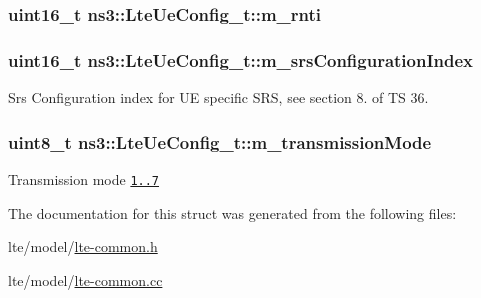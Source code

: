 \subsubsection[{\texorpdfstring{m\+\_\+rnti}{m_rnti}}]{\setlength{\rightskip}{0pt plus 5cm}uint16\+\_\+t ns3\+::\+Lte\+Ue\+Config\+\_\+t\+::m\+\_\+rnti}\hypertarget{structns3_1_1LteUeConfig__t_acba18d5f8ffa2d57965463f040a11ce3}{}\label{structns3_1_1LteUeConfig__t_acba18d5f8ffa2d57965463f040a11ce3}
\subsubsection[{\texorpdfstring{m\+\_\+srs\+Configuration\+Index}{m_srsConfigurationIndex}}]{\setlength{\rightskip}{0pt plus 5cm}uint16\+\_\+t ns3\+::\+Lte\+Ue\+Config\+\_\+t\+::m\+\_\+srs\+Configuration\+Index}\hypertarget{structns3_1_1LteUeConfig__t_a600c359ff7f96077be5ff3688efa6fba}{}\label{structns3_1_1LteUeConfig__t_a600c359ff7f96077be5ff3688efa6fba}
Srs Configuration index for UE specific S\+RS, see section 8. of TS 36. 
\subsubsection[{\texorpdfstring{m\+\_\+transmission\+Mode}{m_transmissionMode}}]{\setlength{\rightskip}{0pt plus 5cm}uint8\+\_\+t ns3\+::\+Lte\+Ue\+Config\+\_\+t\+::m\+\_\+transmission\+Mode}\hypertarget{structns3_1_1LteUeConfig__t_af9fdece658d006d7f6d69819fe40f42b}{}\label{structns3_1_1LteUeConfig__t_af9fdece658d006d7f6d69819fe40f42b}
Transmission mode \href{i.e., SISO, MIMO, etc.}{\tt 1..7} 

The documentation for this struct was generated from the following files\+:\begin{DoxyCompactItemize}
\item 
lte/model/\hyperlink{lte-common_8h}{lte-\/common.\+h}\item 
lte/model/\hyperlink{lte-common_8cc}{lte-\/common.\+cc}\end{DoxyCompactItemize}
